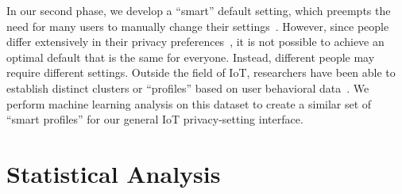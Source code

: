 In our second phase, we develop a ``smart'' default setting, which preempts the need for many users to manually change their settings~\cite{smith2013choice}. However, since people differ extensively in their privacy preferences~\cite{olson2005study}, it is not possible to achieve an optimal default that is the same for everyone. Instead, different people may require different settings. Outside the field of IoT, researchers have been able to establish distinct clusters or ``profiles'' based on user behavioral data~\cite{knijnenburg2013dimensionality, olson2005study, wisniewski2017making}. We perform machine learning analysis on this dataset to create a similar set of ``smart profiles'' for our general IoT privacy-setting interface.

\section{Statistical Analysis}\label{sec:sa1}

